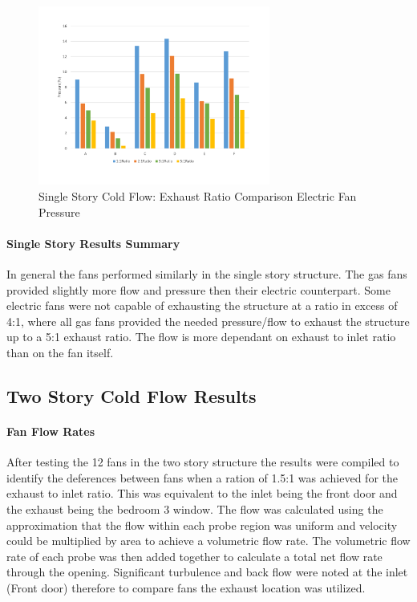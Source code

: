 \documentclass{article}
\begin{document}
	\begin{figure} [H]
		\centering
		\includegraphics[width=3in]{0_Images/ColdFlow/Single_Story/Ratio_Pressure_Dining_Ele.pdf}
		\caption{Single Story Cold Flow: Exhaust Ratio Comparison Electric Fan Pressure}
		\label{fig:Ratio_Pressure_ele}
	\end{figure}

\paragraph{Single Story Results Summary} \mbox{}

In general the fans performed similarly in the single story structure. The gas fans provided slightly more flow and pressure then their electric counterpart. Some electric fans were not capable of exhausting the structure at a ratio in excess of 4:1, where all gas fans provided the needed pressure/flow to exhaust the structure up to a 5:1 exhaust ratio. The flow is more dependant on exhaust to inlet ratio than on the fan itself.

\subsection{Two Story Cold Flow Results}

\paragraph{Fan Flow Rates} \mbox{}

After testing the 12 fans in the two story structure the results were compiled to identify the deferences between fans when a ration of 1.5:1 was achieved for the exhaust to inlet ratio. This was equivalent to the inlet being the front door and the exhaust being the bedroom 3 window.  The flow was calculated using the approximation that the flow within each probe region was uniform and velocity could be multiplied by area to achieve a volumetric flow rate. The volumetric flow rate of each probe was then added together to calculate a total net flow rate through the opening. Significant turbulence and back flow were noted at the inlet (Front door) therefore to compare fans the exhaust location was utilized. 
\end{document}
